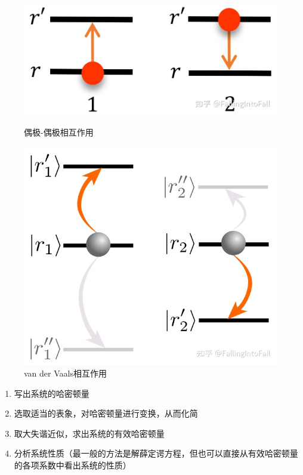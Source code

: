 \documentclass[fontset=windows,toc=true,type=bachelor,stage=opening,campus=weihai]{hithesisart}
\begin{document}
\begin{figure}
\begin{minipage}{0.4\linewidth}
\centering
\includegraphics[width=\linewidth]{v-dd}
\caption{偶极-偶极相互作用}
\label{fig:v-dd}
\end{minipage}
\qquad
\begin{minipage}{0.4\linewidth}
\centering
\includegraphics[width=0.8\linewidth]{v-vdw}
\caption{van der Vaals相互作用}
\label{fig:v-vdw}
\end{minipage}
\end{figure}



\begin{enumerate}
\item 写出系统的哈密顿量
\item 选取适当的表象，对哈密顿量进行变换，从而化简
\item 取大失谐近似，求出系统的有效哈密顿量
\item 分析系统性质（最一般的方法是解薛定谔方程，但也可以直接从有效哈密顿量的各项系数中看出系统的性质）
\end{enumerate}
\end{document}
